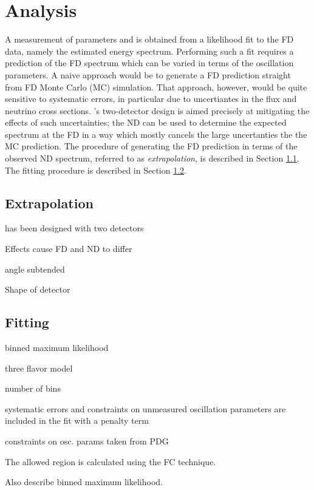 \chapter{Analysis}
\label{analysis_chapter}

A measurement of parameters \deltamtht and \thetatth is obtained from
a likelihood fit to the FD data, namely the estimated energy spectrum.
Performing such a fit requires a prediction of the FD spectrum which can be
varied in terms of the oscillation parameters.
A naive approach would be to generate a FD prediction straight from
FD Monte Carlo (MC) simulation.
That approach, however, would be quite sensitive to systematic errors,
in particular due to uncertiantes in the \numi flux and neutrino
cross sections.
\nova's two-detector design is aimed precisely at mitigating the effects of
such uncertainties; the ND can be used to determine the expected
spectrum at the FD in a way which mostly cancels the large uncertanties the
the MC prediction.
The procedure of generating the FD prediction in terms of the observed
ND spectrum, referred to as \textit{extrapolation}, is described in Section
\ref{extrap_section}.
The fitting procedure is described in Section \ref{fitting_section}.


\section{Extrapolation}
\label{extrap_section}

\nova has been designed with two detectors

Effects cause FD and ND to differ

  angle subtended

  Shape of detector



\section{Fitting}
\label{fitting_section}

binned maximum likelihood 

three flavor model

number of bins

systematic errors and constraints on unmeasured oscillation parameters
are included in the fit with a penalty term

constraints on osc. params taken from PDG

The allowed region is calculated using the FC technique.

Also describe binned maximum likelihood.



